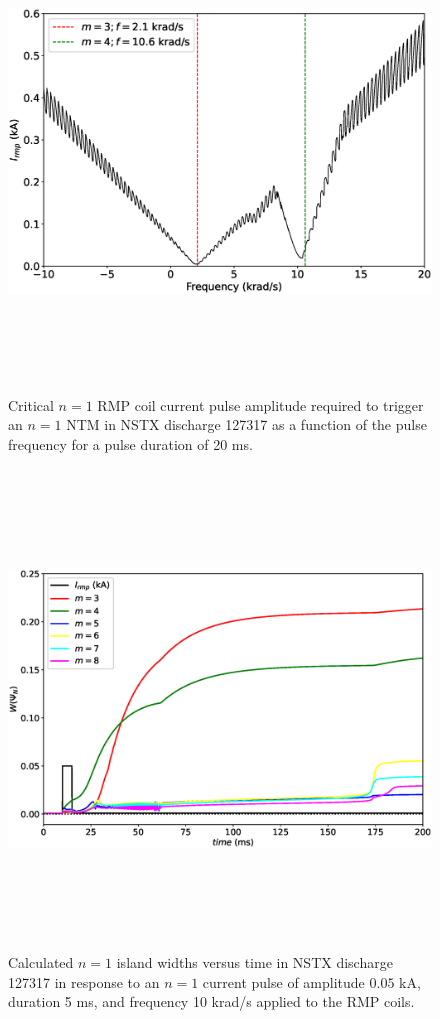 \documentclass[12pt,prb,aps]{revtex4-1}
\begin{document}
\begin{figure}
\centerline{\includegraphics[height=5in]{Fig7.eps}}
\caption{Critical $n=1$ RMP coil current pulse amplitude required to trigger an $n=1$ NTM in NSTX discharge 127317 
as a function of the pulse frequency for a pulse duration of 20 ms.}\label{fig7}
\end{figure}

\begin{figure}
\centerline{\includegraphics[height=5in]{Fig8.eps}}
\caption{Calculated $n=1$ island widths versus time in NSTX discharge 127317 in response to an $n=1$ current pulse of amplitude $0.05$ kA, duration 5 ms, and frequency 10 krad/s applied to the RMP coils.}\label{fig8}
\end{figure}
\end{document}
